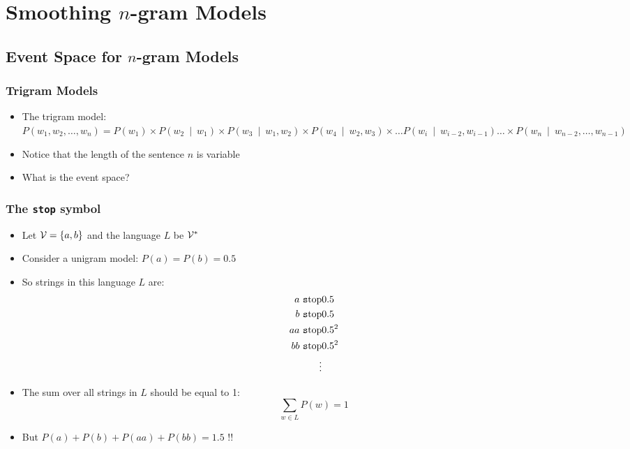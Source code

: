 \documentclass{beamer}
\begin{document}


\section{Smoothing $n$-gram Models}
\frame{\tableofcontents[currentsection]}

\subsection{Event Space for $n$-gram Models}

\begin{frame}
\frametitle{Trigram Models}
\begin{itemize}[<+->]
\item The trigram model:\\
$P(w_1, w_2, \ldots, w_n) = P(w_1) \times P(w_2~\mid~w_1) \times 
P(w_3~\mid~w_1, w_2) \times P(w_4~\mid~w_2, w_3) 
\times \ldots P(w_i~\mid~w_{i-2}, w_{i-1}) \ldots 
\times P(w_n~\mid~w_{n-2}, \ldots, w_{n-1}) $
\item Notice that the length of the sentence $n$ is variable
\item What is the event space?
\end{itemize}
\end{frame}

\newcommand{\lmstop}{\mbox{\texttt stop}}

\begin{frame}
\frametitle{The {\tt stop} symbol}
\begin{itemize}[<+->]
\item Let ${\cal V} = \{ a, b \}$ and the language $L$ be ${\cal V}^\ast$
\item Consider a unigram model: $P(a) = P(b) = 0.5$
\item So strings in this language $L$ are:
\begin{eqnarray*}
a\ \lmstop & 0.5 \\
b\ \lmstop & 0.5 \\
aa\ \lmstop & 0.5^2 \\
bb\ \lmstop & 0.5^2 \\
\vdots
\end{eqnarray*}
\item The sum over all strings in $L$ should be equal to 1:
\[ \sum_{w \in L} P(w) = 1 \]
\item But $P(a) + P(b) + P(aa) + P(bb) = 1.5$ !! 
\end{itemize}
\end{frame}
\end{document}
